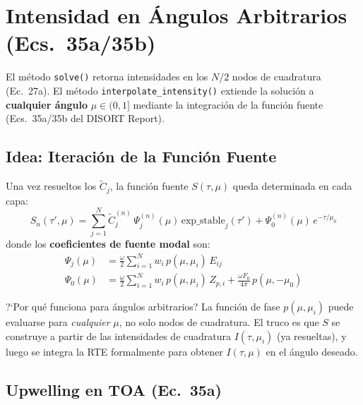 \documentclass[a4paper,11pt]{article}
\begin{document}
\section{Intensidad en \'Angulos Arbitrarios (Ecs.~35a/35b)}
\label{sec:interp35}

El m\'etodo \texttt{solve()} retorna intensidades en los $N/2$ nodos de cuadratura (Ec.~27a).  El m\'etodo \texttt{interpolate\_intensity()} extiende la soluci\'on a \textbf{cualquier \'angulo} $\mu \in (0, 1]$ mediante la integraci\'on de la funci\'on fuente (Ecs.~35a/35b del DISORT Report).

\subsection{Idea: Iteraci\'on de la Funci\'on Fuente}

Una vez resueltos los $\widetilde{C}_j$, la funci\'on fuente $S(\tau, \mu)$ queda determinada en cada capa:
\begin{equation}
S_n(\tau', \mu) = \sum_{j=1}^{N} \widetilde{C}_j^{(n)} \, \Psi_j^{(n)}(\mu) \, \text{exp\_stable}_j(\tau') + \Psi_0^{(n)}(\mu) \, e^{-\tau/\mu_0}
\end{equation}
donde los \textbf{coeficientes de fuente modal} son:
\begin{align}
\Psi_j(\mu) &= \frac{\omega}{2} \sum_{i=1}^{N} w_i \, p(\mu, \mu_i) \, E_{ij} \label{eq:psi_j} \\
\Psi_0(\mu) &= \frac{\omega}{2} \sum_{i=1}^{N} w_i \, p(\mu, \mu_i) \, Z_{p,i} + \frac{\omega F_0}{4\pi} \, p(\mu, -\mu_0) \label{eq:psi_0}
\end{align}

\begin{physics}{?`Por qu\'e funciona para \'angulos arbitrarios?}
La funci\'on de fase $p(\mu, \mu_i)$ puede evaluarse para \textit{cualquier} $\mu$, no solo nodos de cuadratura.  El truco es que $S$ se construye a partir de las intensidades de cuadratura $I(\tau, \mu_i)$ (ya resueltas), y luego se integra la RTE formalmente para obtener $I(\tau, \mu)$ en el \'angulo deseado.
\end{physics}

\subsection{Upwelling en TOA (Ec.~35a)}
\end{document}
